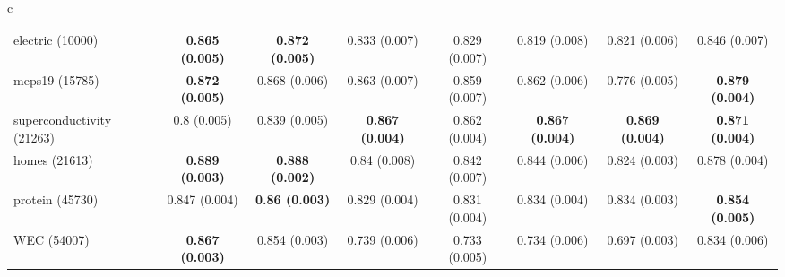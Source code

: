 \documentclass[border=6pt]{standalone}
\begin{document}
\begin{adjustbox}{max width=\linewidth}
\begin{tabular}{c}
\begin{tabular}{lccccccc}
electric (10000) & \textbf{0.865 (0.005)} & \textbf{0.872 (0.005)} & 0.833 (0.007) & 0.829 (0.007) & 0.819 (0.008) & 0.821 (0.006) & 0.846 (0.007)\\
meps19 (15785) & \textbf{0.872 (0.005)} & 0.868 (0.006) & 0.863 (0.007) & 0.859 (0.007) & 0.862 (0.006) & 0.776 (0.005) & \textbf{0.879 (0.004)}\\
superconductivity (21263) & 0.8 (0.005) & 0.839 (0.005) & \textbf{0.867 (0.004)} & 0.862 (0.004) & \textbf{0.867 (0.004)} & \textbf{0.869 (0.004)} & \textbf{0.871 (0.004)}\\
homes (21613) & \textbf{0.889 (0.003)} & \textbf{0.888 (0.002)} & 0.84 (0.008) & 0.842 (0.007) & 0.844 (0.006) & 0.824 (0.003) & 0.878 (0.004)\\
protein (45730) & 0.847 (0.004) & \textbf{0.86 (0.003)} & 0.829 (0.004) & 0.831 (0.004) & 0.834 (0.004) & 0.834 (0.003) & \textbf{0.854 (0.005)}\\
WEC (54007) & \textbf{0.867 (0.003)} & 0.854 (0.003) & 0.739 (0.006) & 0.733 (0.005) & 0.734 (0.006) & 0.697 (0.003) & 0.834 (0.006)\\
\hline
\end{tabular}
\end{tabular}
\end{adjustbox}
\end{document}
